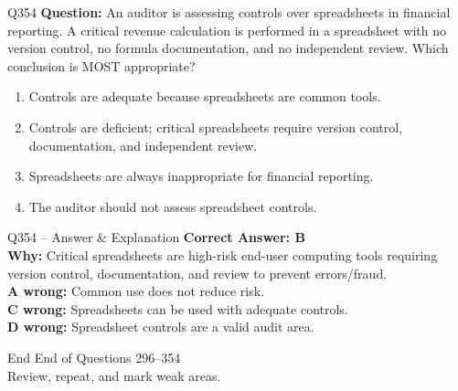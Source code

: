 \documentclass[aspectratio=169,10pt]{beamer}
\begin{document}
	\begin{frame}[t]{Q354}
		\small
		\textbf{Question:} An auditor is assessing controls over spreadsheets in financial reporting. A critical revenue calculation is performed in a spreadsheet with no version control, no formula documentation, and no independent review. Which conclusion is MOST appropriate?
		\begin{enumerate}[label=\Alph*.,itemsep=1pt,topsep=2pt]
			\item Controls are adequate because spreadsheets are common tools.
			\item Controls are deficient; critical spreadsheets require version control, documentation, and independent review.
			\item Spreadsheets are always inappropriate for financial reporting.
			\item The auditor should not assess spreadsheet controls.
		\end{enumerate}
	\end{frame}
	
	\begin{frame}[t]{Q354 -- Answer \& Explanation}
		\small
		\textbf{Correct Answer: B} \\[4pt]
		\textbf{Why:} Critical spreadsheets are high-risk end-user computing tools requiring version control, documentation, and review to prevent errors/fraud. \\[4pt]
		\textbf{A wrong:} Common use does not reduce risk. \\[2pt]
		\textbf{C wrong:} Spreadsheets can be used with adequate controls. \\[2pt]
		\textbf{D wrong:} Spreadsheet controls are a valid audit area.
	\end{frame}
	
	\begin{frame}{End}
		\centering
		\Large End of Questions 296--354\\[8pt]
		\normalsize Review, repeat, and mark weak areas.
	\end{frame}
	
\end{document}
